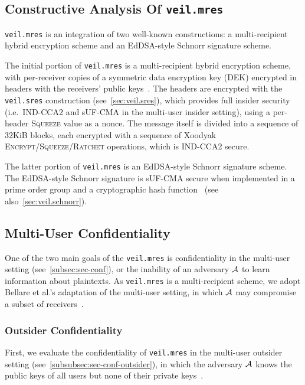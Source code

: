 \subsection{Constructive Analysis Of \texttt{veil.mres}}\label{subsec:veil.mres-analysis}

\texttt{veil.mres} is an integration of two well-known constructions: a multi-recipient hybrid encryption scheme and an
EdDSA-style Schnorr signature scheme.

The initial portion of \texttt{veil.mres} is a multi-recipient hybrid encryption scheme, with per-receiver copies of a
symmetric data encryption key (DEK) encrypted in headers with the receivers' public
keys~\cite{kurosawa2002, bellare2003, bellare2007, rfc4880}.
The headers are encrypted with the \texttt{veil.sres} construction (see~\ref{sec:veil.sres}), which provides full
insider security (i.e.\ IND-CCA2 and sUF-CMA in the multi-user insider setting), using a per-header \textsc{Squeeze}
value as a nonce.
The message itself is divided into a sequence of 32KiB blocks, each encrypted with a sequence of Xoodyak
\textsc{Encrypt}/\textsc{Squeeze}/\textsc{Ratchet} operations, which is IND-CCA2 secure.

The latter portion of \texttt{veil.mres} is an EdDSA-style Schnorr signature scheme.
The EdDSA-style Schnorr signature is sUF-CMA secure when implemented in a prime order group and a cryptographic hash
function~\cite{brendel2021, chalkias2020, pointcheval2000, neven2009} (see also~\ref{sec:veil.schnorr}).

\subsection{Multi-User Confidentiality}\label{subsec:veil.mres-conf}

One of the two main goals of the \texttt{veil.mres} is confidentiality in the multi-user setting
(see~\ref{subsec:sec-conf}), or the inability of an adversary $\mathcal{A}$ to learn information about plaintexts.
As \texttt{veil.mres} is a multi-recipient scheme, we adopt Bellare et al.'s adaptation of the multi-user
setting, in which $\mathcal{A}$ may compromise a subset of receivers~\cite{bellare2007}.

\subsubsection{Outsider Confidentiality}

First, we evaluate the confidentiality of \texttt{veil.mres} in the multi-user outsider setting
(see~\ref{subsubsec:sec-conf-outsider}), in which the adversary $\mathcal{A}$ knows the public keys of all users but none
of their private keys~\cite[p. 44]{baek2010}.


